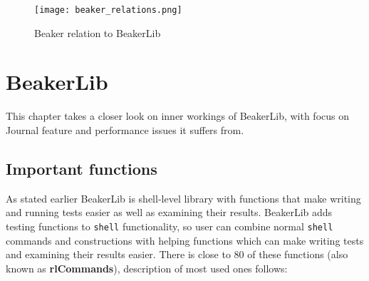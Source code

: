 \begin{figure}
  \texttt{[image: beaker\_relations.png]}
  \caption{Beaker relation to BeakerLib}
  \label{fig:beaker_relation}
\end{figure}

\chapter{BeakerLib}
\label{beakerlib_chapter}

This chapter takes a closer look on inner workings of BeakerLib, with focus on Journal feature and performance issues it suffers from. 

\section{Important functions}
As stated earlier BeakerLib is shell-level library with functions that make writing and running tests easier as well as examining their results.
BeakerLib adds testing functions to \texttt{shell} functionality, so user can combine normal \texttt{shell} commands and constructions with helping functions which can make writing tests and examining their results easier. There is close to 80 of these functions (also known as \textbf{rlCommands}), description of most used ones follows:
